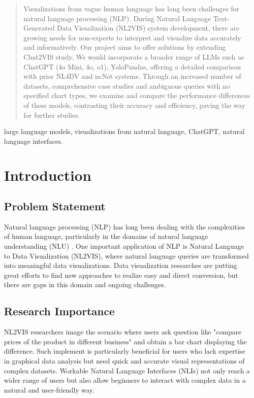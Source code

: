 \documentclass[conference]{IEEEtran}
\begin{document}
\maketitle

\begin{abstract}
    Visualizations from vague human language has long been challenges for natural language processing (NLP). During Natural Language Text-Generated Data Visualization (NL2VIS) system development, there are growing needs for non-experts to interpret and visualize data accurately and informatively. Our project aims to offer solutions by extending Chat2VIS study. We would incorporate a broader range of LLMs such as ChatGPT (4o Mini, 4o, o1), YoloPandas, offering a detailed comparison with prior NL4DV and ncNet systems. Through an increased number of datasets, comprehensive case studies and ambiguous queries with no specified chart types, we examine and compare the performance differences of these models, contrasting their accuracy and efficiency, paving the way for further studies. 
\end{abstract}

\begin{IEEEkeywords}
    large language models, visualizations from natural language, ChatGPT, natural language  interfaces.
\end{IEEEkeywords}

\section{Introduction}
\subsection{Problem Statement}
Natural language processing (NLP) has long been dealing with the complexities of human language, particularly in the domains of natural language understanding (NLU) \cite{yenduri2024gpt}. One important application of NLP is Natural Language to Data Visualization (NL2VIS), where natural language queries are transformed into meaningful data visualizations. Data visualization researches are putting great efforts to find new approaches to realize easy and direct conversion, but there are gaps in this domain and ongoing challenges. 

\subsection{Research Importance}
NL2VIS researchers image the scenario where users ask question like "compare prices of the product in different business" and obtain a bar chart displaying the difference. Such implement is particularly beneficial for users who lack expertise in graphical data analysis but need quick and accurate visual representations of complex datasets. Workable Natural Language Interfaces (NLIs) not only reach a wider range of users but also allow beginners to interact with complex data in a natural and user-friendly way.
\end{document}
